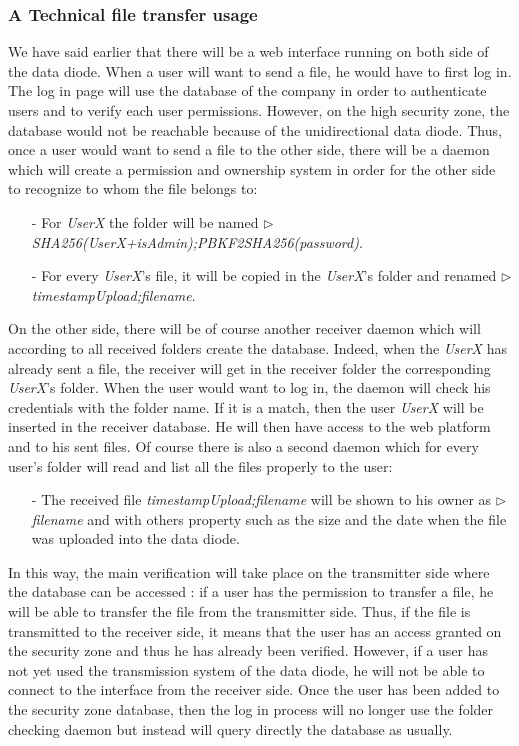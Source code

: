 \documentclass[a4paper,10pt]{article}
\begin{document}
\subsubsection{A Technical file transfer usage}
We have said earlier that there will be a web interface running on both side of the data diode. When a user will want to send a file, he would have to first log in. The log in page will use the database of the company in order to authenticate users and to verify each user permissions. However, on the high security zone, the database would not be reachable because of the unidirectional data diode. Thus, once a user would want to send a file to the other side, there will be a daemon which will create a permission and ownership system in order for the other side to recognize to whom the file belongs to:
\begin{enumerate}
\item[-]For \emph{UserX} the folder will be named $\triangleright$ \emph{SHA256(UserX+isAdmin);PBKF2SHA256(password)}.
\item[-]For every \emph{UserX}'s file, it will be copied in the \emph{UserX}'s folder and renamed $\triangleright$ \emph{timestampUpload;filename}.
\end{enumerate}
 
On the other side, there will be of course another receiver daemon which will according to all received folders create the database. Indeed, when the \emph{UserX} has already sent a file, the receiver will get in the receiver folder the corresponding \emph{UserX}'s folder. When the user would want to log in, the daemon will check his credentials with the folder name. If it is a match, then the user \emph{UserX} will be inserted in the receiver database. He will then have access to the web platform and to his sent files. Of course there is also a second daemon which for every user's folder will read and list all the files properly to the user:

\begin{enumerate}

\item[-] The received file \emph{timestampUpload;filename} will be shown to his owner as $\triangleright$ \emph{filename} and with others property such as the size and the date when the file was uploaded into the data diode.
\end{enumerate}

In this way, the main verification will take place on the transmitter side where the database can be accessed : if a user has the permission to transfer a file, he will be able to transfer the file from the transmitter side. Thus, if the file is transmitted to the receiver side, it means that the user has an access granted on the security zone and thus he has already been verified. However, if a user has not yet used the transmission system of the data diode, he will not be able to connect to the interface from the receiver side. Once the user has been added to the security zone database, then the log in process will no longer use the folder checking daemon but instead will query directly the database as usually.
\end{document}
